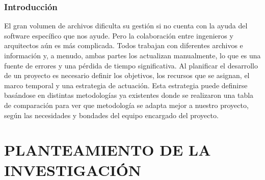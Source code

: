 \documentclass[12pt,a4paper,oneside]{article}
\begin{document}
\newpage


\subsubsection*{\centering Introducción}
El gran volumen de archivos dificulta su gestión si no cuenta con la ayuda del software específico que nos ayude. Pero la colaboración entre ingenieros y arquitectos aún es más complicada. Todos trabajan con diferentes archivos e información y, a menudo, ambas partes los actualizan manualmente, lo que es una fuente de errores y una pérdida de tiempo significativa. Al planificar el desarrollo de un proyecto es necesario definir los objetivos, los recursos que se asignan, el marco temporal y una estrategia de actuación. Esta estrategia puede definirse basándose en distintas metodologías ya existentes donde se realizaron una tabla de comparación para ver que metodología se adapta mejor a nuestro proyecto, según las necesidades y bondades del equipo encargado del proyecto.
\newpage


\tableofcontents
\newpage

\section{PLANTEAMIENTO DE LA INVESTIGACIÓN}
\end{document}
